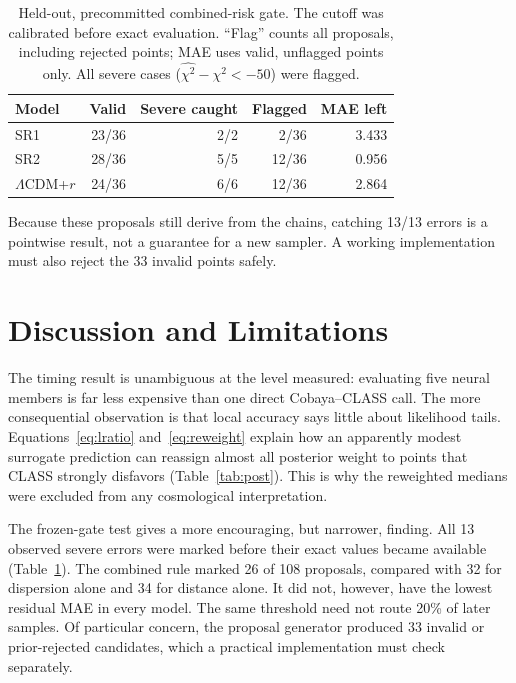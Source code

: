 \documentclass[a4paper,conference,10pt]{IEEEtran}
\begin{document}
\begin{table}[t]
\caption{Held-out, precommitted combined-risk gate.
The cutoff was calibrated before exact evaluation. ``Flag'' counts
all proposals, including rejected points; MAE uses valid, unflagged
points only. All severe cases ($\widehat{\chi^2}-\chi^2<-50$) were flagged.}
\label{tab:frozen}
\centering\footnotesize
\setlength{\tabcolsep}{3.5pt}
\begin{tabular}{@{}lrrrr@{}}
\toprule
Model & Valid & Severe caught & Flagged & MAE left \\
\midrule
SR1 & 23/36 & 2/2 & 2/36 & 3.433 \\
SR2 & 28/36 & 5/5 & 12/36 & 0.956 \\
$\Lambda$CDM+$r$ & 24/36 & 6/6 & 12/36 & 2.864 \\
\bottomrule
\end{tabular}
\end{table}

Because these proposals still derive from the chains, catching 13/13 errors is a pointwise result, not a guarantee for a new sampler. A working implementation must also reject the 33 invalid points safely.

\section{Discussion and Limitations}
The timing result is unambiguous at the level measured: evaluating five neural members is far less expensive than one direct Cobaya--CLASS call. The more consequential observation is that local accuracy says little about likelihood tails. Equations~\eqref{eq:lratio} and~\eqref{eq:reweight} explain how an apparently modest surrogate prediction can reassign almost all posterior weight to points that CLASS strongly disfavors (Table~\ref{tab:post}). This is why the reweighted medians were excluded from any cosmological interpretation.

The frozen-gate test gives a more encouraging, but narrower, finding. All 13 observed severe errors were marked before their exact values became available (Table~\ref{tab:frozen}). The combined rule marked 26 of 108 proposals, compared with 32 for dispersion alone and 34 for distance alone. It did not, however, have the lowest residual MAE in every model. The same threshold need not route 20\% of later samples. Of particular concern, the proposal generator produced 33 invalid or prior-rejected candidates, which a practical implementation must check separately.
\end{document}
